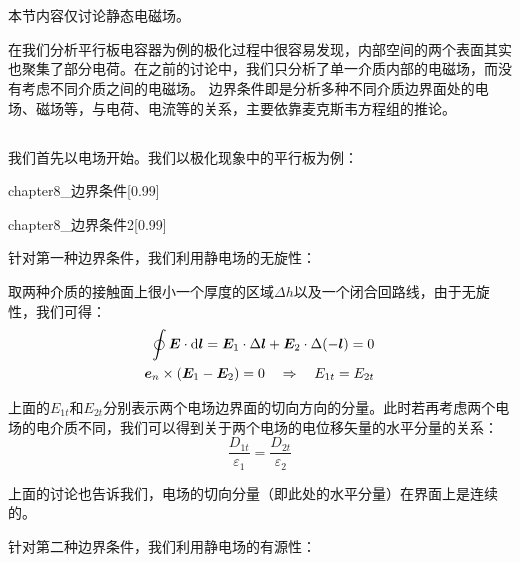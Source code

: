 \section[边界条件]{}
本节内容仅讨论静态电磁场。

在我们分析平行板电容器为例的极化过程中很容易发现，内部空间的两个表面其实也聚集了部分电荷。在之前的讨论中，我们只分析了单一介质内部的电磁场，而没有考虑不同介质之间的电磁场。
边界条件即是分析多种不同介质边界面处的电场、磁场等，与电荷、电流等的关系，主要依靠麦克斯韦方程组的推论。
\subsection[电场和电流密度边界条件]{}
我们首先以电场开始。我们以极化现象中的平行板为例：

\begin{minipage}{0.45\textwidth}
    \begin{singlefigure}[无旋性的结论]{chapter8_边界条件}[0.99]
    \end{singlefigure}
\end{minipage}
\begin{minipage}{0.45\textwidth}
    \begin{singlefigure}[有源性的结论]{chapter8_边界条件2}[0.99]
    \end{singlefigure}
\end{minipage}
\vspace{2em}

针对第一种边界条件，我们利用静电场的无旋性：

取两种介质的接触面上很小一个厚度的区域$\Delta h$以及一个闭合回路线，由于无旋性，我们可得：
\begin{align*}
    \oint \vec{E}\cdot\dif{\vec{l}}=\vec{E}_1\cdot\Delta\vec{l}+\vec{E}_2\cdot\Delta (-\vec{l})=0\\
    \vec{e}_n\times(\vec{E}_1-\vec{E}_2)=0\quad\Rightarrow\quad E_{1t}=E_{2t}
\end{align*}

上面的$E_{1t}$和$E_{2t}$分别表示两个电场边界面的切向方向的分量。此时若再考虑两个电场的电介质不同，我们可以得到关于两个电场的电位移矢量的水平分量的关系：
\[\dfrac{D_{1t}}{\varepsilon_1}=\dfrac{D_{2t}}{\varepsilon_2}\]

上面的讨论也告诉我们，电场的切向分量（即此处的水平分量）在界面上是连续的。

针对第二种边界条件，我们利用静电场的有源性：

